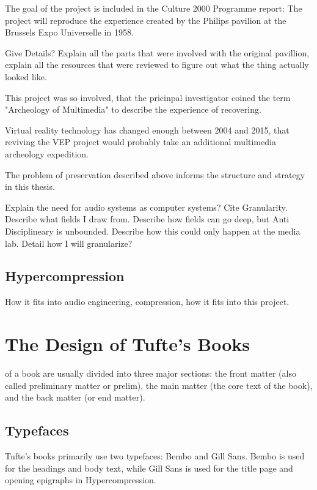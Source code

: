 \documentclass{tufte-book}
\newcommand{\thesis}{Hypercompression\xspace}
\begin{document}
The goal of the project is included in the Culture 2000 Programme report:
The project will reproduce the experience created by the Philips pavilion at the Brussels Expo
Universelle in 1958. 

Give Details? Explain all the parts that were involved with the original pavillion, explain all the resources that were reviewed to figure out what the thing actually looked like. 

This project was so involved, that the pricinpal investigator coined the term "Archeology of Multimedia" to describe the experience of recovering\cite{TODO}. 

Virtual reality technology has changed enough between 2004 and 2015, that reviving the VEP project would probably take an additional multimedia archeology expedition.

The problem of preservation described above informs the structure and strategy in this thesis. 

Explain the need for audio systems as computer systems? Cite Granularity. Describe what fields I draw from. Describe how fields can go deep, but Anti Disciplineary is unbounded. Describe how this could only happen at the media lab. Detail how I will granularize?

\section{Hypercompression}
How it fits into audio engineering, compression, how it fits into this project. 


\mainmatter


\chapter{The Design of Tufte's Books}
\label{ch:tufte-design}


 of a book are usually divided into three major
sections: the front matter (also called preliminary matter or prelim), the
main matter (the core text of the book), and the back matter (or end
matter).

\section{Typefaces}\label{sec:typefaces1}

Tufte's books primarily use two typefaces: Bembo and Gill Sans.  Bembo is used
for the headings and body text, while Gill Sans is used for the title page and
opening epigraphs in \thesis.
\end{document}
